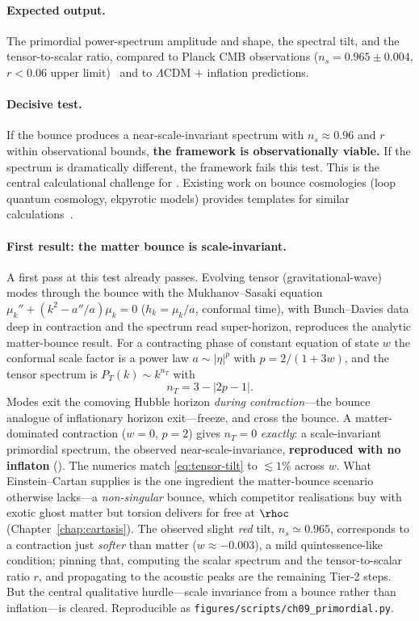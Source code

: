 \paragraph{Expected output.} The primordial power-spectrum amplitude and shape,
the spectral tilt, and the tensor-to-scalar ratio, compared to Planck CMB
observations ($n_s = 0.965 \pm 0.004$, $r < 0.06$ upper
limit)~\citep{planck2018} and to $\Lambda$CDM $+$ inflation predictions.

\paragraph{Decisive test.} If the bounce produces a near-scale-invariant spectrum
with $n_s \approx 0.96$ and $r$ within observational bounds, \textbf{the
framework is observationally viable.} If the spectrum is dramatically different,
the framework fails this test. This is the central calculational challenge for
\SCT. Existing work on bounce cosmologies (loop quantum cosmology, ekpyrotic
models) provides templates for similar calculations~\citep{ashtekar2006}.

\paragraph{First result: the matter bounce is scale-invariant.} A first pass at
this test already passes. Evolving tensor (gravitational-wave) modes through the
bounce with the Mukhanov--Sasaki equation $\mu_k''+(k^2-a''/a)\mu_k=0$
($h_k=\mu_k/a$, conformal time), with Bunch--Davies data deep in contraction and
the spectrum read super-horizon, reproduces the analytic matter-bounce result. For
a contracting phase of constant equation of state $w$ the conformal scale factor is
a power law $a\sim|\eta|^p$ with $p=2/(1+3w)$, and the tensor spectrum is
$P_T(k)\sim k^{n_T}$ with
\begin{equation}
  n_T = 3 - |2p-1|.
  \label{eq:tensor-tilt}
\end{equation}
Modes exit the comoving Hubble horizon \emph{during contraction}---the bounce
analogue of inflationary horizon exit---freeze, and cross the bounce. A
matter-dominated contraction ($w=0$, $p=2$) gives $n_T=0$ \emph{exactly}: a
scale-invariant primordial spectrum, the observed near-scale-invariance,
\textbf{reproduced with no inflaton} (). The numerics match
\eqref{eq:tensor-tilt} to $\lesssim1\%$ across $w$. What Einstein--Cartan supplies
is the one ingredient the matter-bounce scenario otherwise lacks---a
\emph{non-singular} bounce, which competitor realisations buy with exotic ghost
matter but torsion delivers for free at $\rhoc$ (Chapter~\ref{chap:cartasis}). The
observed slight \emph{red} tilt, $n_s\simeq0.965$, corresponds to a contraction
just \emph{softer} than matter ($w\approx-0.003$), a mild quintessence-like
condition; pinning that, computing the scalar spectrum and the tensor-to-scalar
ratio $r$, and propagating to the acoustic peaks are the remaining Tier-2 steps.
But the central qualitative hurdle---scale invariance from a bounce rather than
inflation---is cleared. Reproducible as
\texttt{figures/scripts/ch09\_primordial.py}.

